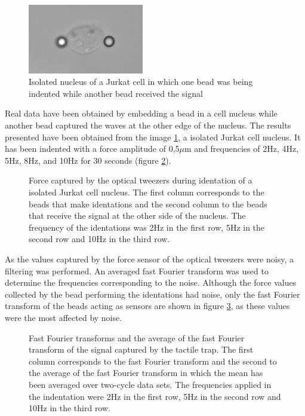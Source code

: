 \documentclass[12pt, a4paper]{article} %
\begin{document}
	\begin{figure}
		\centering
		\includegraphics[width=0.45\textwidth]{figures/recorte_nucleo.png}
		\caption{Isolated nucleus of a Jurkat cell in which one bead was being indented while another bead received the signal}
		\label{fig:myfig3}
	\end{figure}
	Real data have been obtained by embedding a bead in a cell nucleus while another bead captured the waves at the other edge of the nucleus. The results presented have been obtained from the image \ref{fig:myfig3}, a isolated Jurkat cell nucleus. It has been indented with a force amplitude of 0,5$\mu$m and frequencies of 2Hz, 4Hz, 5Hz, 8Hz, and 10Hz for 30 seconds (figure \ref{fig:raw_data}).
	\setlength{\parskip}{4mm}
	\begin{figure}[htbp]
		\centering
		
		\caption{Force captured by the optical tweezers during identation of a isolated Jurkat cell nucleus. The first column corresponds to the beads that make identations and the second column to the beads that receive the signal at the other side of the nucleus. The frequency of the identations was 2Hz in the first row, 5Hz in the second row and 10Hz in the third row.}
		\label{fig:raw_data}
	\end{figure}
	
	As the values captured by the force sensor of the optical tweezers were noisy, a filtering was performed. An averaged fast Fourier transform was used to determine the frequencies corresponding to the noise. Although the force values collected by the bead performing the identations had noise, only the fast Fourier transform of the beads acting as sensors are shown in figure \ref{fig:fourier_sin_filtro}, as these values were the most affected by noise. 
	\begin{figure}[htbp]
		\centering
		
		\caption{Fast Fourier transforms and the average of the fast Fourier transform of the signal captured by the tactile trap. The first column corresponds to the fast Fourier transform and the second to the average of the fast Fourier transform in which the mean has been averaged over two-cycle data sets. The frequencies applied in the indentation were 2Hz in the first row, 5Hz in the second row and 10Hz in the third row.}
		\label{fig:fourier_sin_filtro}
	\end{figure}
	
\end{document}
